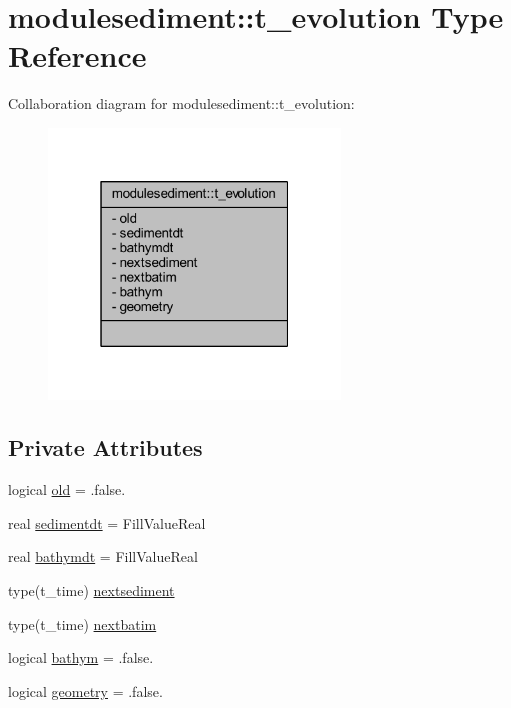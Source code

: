 \hypertarget{structmodulesediment_1_1t__evolution}{}\section{modulesediment\+:\+:t\+\_\+evolution Type Reference}
\label{structmodulesediment_1_1t__evolution}


Collaboration diagram for modulesediment\+:\+:t\+\_\+evolution\+:\nopagebreak
\begin{figure}[H]
\begin{center}
\leavevmode
\includegraphics[width=220pt]{structmodulesediment_1_1t__evolution__coll__graph}
\end{center}
\end{figure}
\subsection*{Private Attributes}
\begin{DoxyCompactItemize}
\item 
logical \mbox{\hyperlink{structmodulesediment_1_1t__evolution_a000b8dc6d454e795c6b776c16c4352fc}{old}} = .false.
\item 
real \mbox{\hyperlink{structmodulesediment_1_1t__evolution_a94b926696e7cd32126a396018d70c6a5}{sedimentdt}} = Fill\+Value\+Real
\item 
real \mbox{\hyperlink{structmodulesediment_1_1t__evolution_a008d4b71111641569db2e24f50059b88}{bathymdt}} = Fill\+Value\+Real
\item 
type(t\+\_\+time) \mbox{\hyperlink{structmodulesediment_1_1t__evolution_af0daf6c1c8e918683db2230a750a0483}{nextsediment}}
\item 
type(t\+\_\+time) \mbox{\hyperlink{structmodulesediment_1_1t__evolution_ac7f627fc05fbec6598f0cbcfd7170935}{nextbatim}}
\item 
logical \mbox{\hyperlink{structmodulesediment_1_1t__evolution_a2c3956fde524a9d701efd4bc0d164fd8}{bathym}} = .false.
\item 
logical \mbox{\hyperlink{structmodulesediment_1_1t__evolution_a82e01bf80a91120f6b0dc16dbe43d033}{geometry}} = .false.
\end{DoxyCompactItemize}


